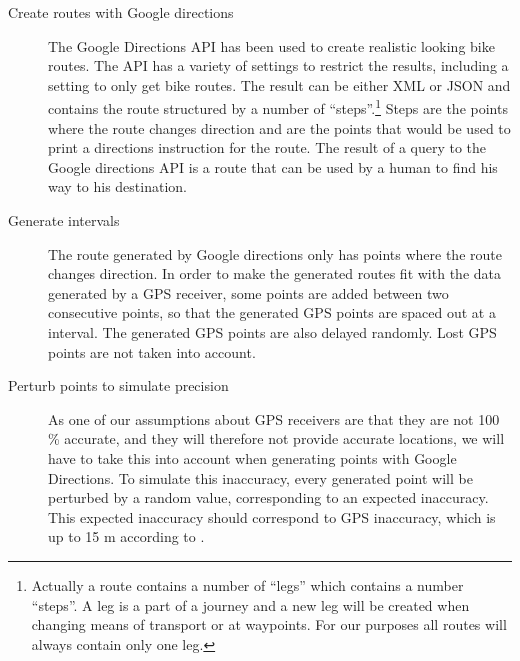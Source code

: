 \begin{description}
\item[Create routes with Google directions] The Google Directions API \cite{gdirections} has been used to create realistic looking bike routes.
The API has a variety of settings to restrict the results, including a setting to only get bike routes.
The result can be either XML or JSON and contains the route structured by a number of ``steps''.\footnote{Actually a route contains a number of  ``legs'' which contains a number ``steps''. 
A leg is a part of a journey and a new leg will be created when changing means of transport or at waypoints.
For our purposes all routes will always contain only one leg.}
Steps are the points where the route changes direction and are the points that would be used to print a directions instruction for the route.
The result of a query to the Google directions API is a route that can be used by a human to find his way to his destination.

\item[Generate intervals] The route generated by Google directions only has points where the route changes direction.
In order to make the generated routes fit with the data generated by a GPS receiver, some points are added between two consecutive points, so that the generated GPS points are spaced out at a interval.
The generated GPS points are also delayed randomly.
Lost GPS points are not taken into account.

\item[Perturb points to simulate precision] As one of our assumptions about GPS receivers are that they are not 100 \% accurate, and they will therefore not provide accurate locations, we will have to take this into account when generating points with Google Directions.
To simulate this inaccuracy, every generated point will be perturbed by a random value, corresponding to an expected inaccuracy.
This expected inaccuracy should correspond to GPS inaccuracy, which is up to 15 m according to \citet{garmingps}.
\end{description}
